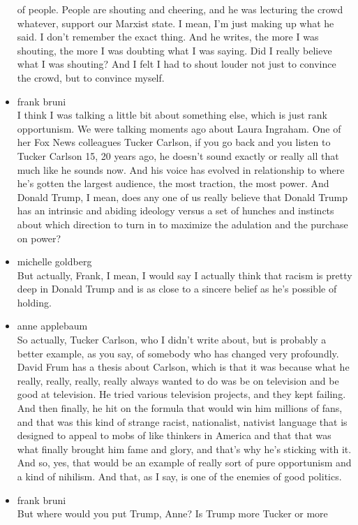 \begin{itemize}
  of people. People are shouting and cheering, and he was lecturing the
  crowd whatever, support our Marxist state. I mean, I'm just making up
  what he said. I don't remember the exact thing. And he writes, the
  more I was shouting, the more I was doubting what I was saying. Did I
  really believe what I was shouting? And I felt I had to shout louder
  not just to convince the crowd, but to convince myself.
\item
  frank bruni\\
  I think I was talking a little bit about something else, which is just
  rank opportunism. We were talking moments ago about Laura Ingraham.
  One of her Fox News colleagues Tucker Carlson, if you go back and you
  listen to Tucker Carlson 15, 20 years ago, he doesn't sound exactly or
  really all that much like he sounds now. And his voice has evolved in
  relationship to where he's gotten the largest audience, the most
  traction, the most power. And Donald Trump, I mean, does any one of us
  really believe that Donald Trump has an intrinsic and abiding ideology
  versus a set of hunches and instincts about which direction to turn in
  to maximize the adulation and the purchase on power?
\item
  michelle goldberg\\
  But actually, Frank, I mean, I would say I actually think that racism
  is pretty deep in Donald Trump and is as close to a sincere belief as
  he's possible of holding.
\item
  anne applebaum\\
  So actually, Tucker Carlson, who I didn't write about, but is probably
  a better example, as you say, of somebody who has changed very
  profoundly. David Frum has a thesis about Carlson, which is that it
  was because what he really, really, really, really always wanted to do
  was be on television and be good at television. He tried various
  television projects, and they kept failing. And then finally, he hit
  on the formula that would win him millions of fans, and that was this
  kind of strange racist, nationalist, nativist language that is
  designed to appeal to mobs of like thinkers in America and that that
  was what finally brought him fame and glory, and that's why he's
  sticking with it. And so, yes, that would be an example of really sort
  of pure opportunism and a kind of nihilism. And that, as I say, is one
  of the enemies of good politics.
\item
  frank bruni\\
  But where would you put Trump, Anne? Is Trump more Tucker or more

\end{itemize}
